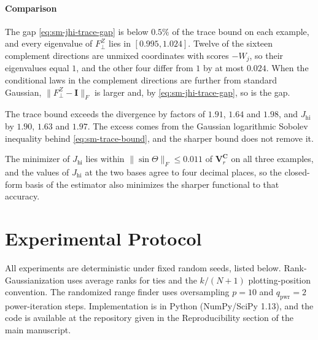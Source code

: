 \documentclass[supplement,review,hidelinks,onefignum,onetabnum]{siamart251216}
\newcommand{\mC}{\bm{C}}
\newcommand{\mV}{\bm{V}}
\newcommand{\mI}{\bm{I}}
\begin{document}
\paragraph{Comparison}

The gap \eqref{eq:sm-jhi-trace-gap} is below $0.5\%$ of the trace bound on each example, and every eigenvalue of $F^Z_\perp$ lies in $[0.995, 1.024]$. Twelve of the sixteen complement directions are unmixed coordinates with scores $-W_j$, so their eigenvalues equal $1$, and the other four differ from $1$ by at most $0.024$. When the conditional laws in the complement directions are further from standard Gaussian, $\|F^Z_\perp - \mI\|_F$ is larger and, by \eqref{eq:sm-jhi-trace-gap}, so is the gap.

The trace bound exceeds the divergence by factors of $1.91$, $1.64$ and $1.98$, and $J_{\mathrm{hi}}$ by $1.90$, $1.63$ and $1.97$. The excess comes from the Gaussian logarithmic Sobolev inequality behind \eqref{eq:sm-trace-bound}, and the sharper bound does not remove it.

The minimizer of $J_{\mathrm{hi}}$ lies within $\|\sin\Theta\|_F \le 0.011$ of $\mV_r^{\mC}$ on all three examples, and the values of $J_{\mathrm{hi}}$ at the two bases agree to four decimal places, so the closed-form basis of the estimator also minimizes the sharper functional to that accuracy.

\section{Experimental Protocol}
\label{sm:experimental-protocol}

All experiments are deterministic under fixed random seeds, listed below. Rank-Gaussianization uses average ranks for ties and the $k/(N+1)$ plotting-position convention. The randomized range finder \cite{HalkoMartinssonTropp2011} uses oversampling $p = 10$ and $q_{\text{pwr}} = 2$ power-iteration steps. Implementation is in Python (NumPy/SciPy 1.13), and the code is available at the repository given in the Reproducibility section of the main manuscript.
\end{document}
